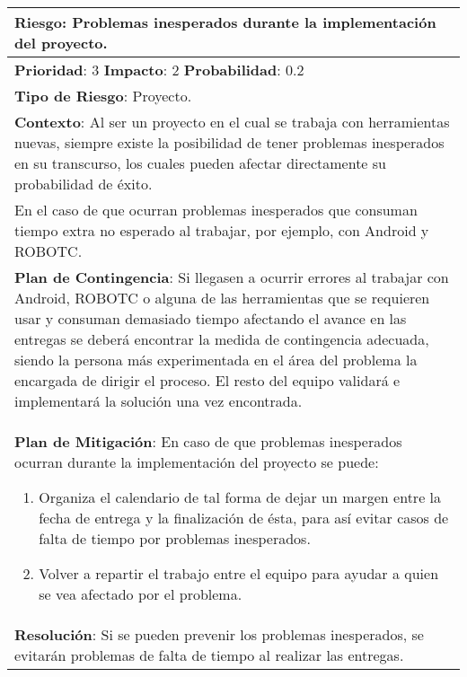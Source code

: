 \begin{table}[H]
  \centering
  \begin{tabular}{|p{15cm}|}\hline
    {\bf Riesgo}: Problemas inesperados durante la implementación del proyecto.\\\hline
    {\bf Prioridad}: 3  {\bf Impacto}: 2  {\bf Probabilidad}: 0.2\\\hline
    {\bf Tipo de Riesgo}: Proyecto.\\\hline
    {\bf Contexto}: Al ser un proyecto en el cual se trabaja con herramientas nuevas, siempre existe la posibilidad de tener problemas inesperados en su transcurso, los cuales pueden afectar directamente su probabilidad de éxito.\\En el caso de que ocurran problemas inesperados que consuman tiempo extra no esperado al trabajar, por ejemplo, con  Android y ROBOTC.\\\hline
    {\bf Plan de Contingencia}: Si llegasen a ocurrir errores al trabajar con Android, ROBOTC o alguna de las herramientas que se requieren usar y consuman demasiado tiempo afectando el avance en las entregas se  deberá encontrar la medida de contingencia adecuada, siendo la persona más experimentada en el área del problema la encargada de dirigir el proceso. El resto del equipo validará e implementará la solución una vez encontrada.\\\hline
    {\bf Plan de Mitigación}:  En caso de que problemas inesperados ocurran durante la implementación  del proyecto se puede:\begin{enumerate}\item Organiza el calendario de tal forma de dejar un margen entre la fecha de entrega y la finalización de ésta, para así evitar casos de falta de tiempo por problemas inesperados.\item Volver a repartir el trabajo entre el equipo para ayudar a quien se vea afectado por el problema.\end{enumerate}\\\hline
    {\bf Resolución}: Si se pueden prevenir los problemas inesperados, se evitarán problemas de falta de tiempo al realizar las entregas.\\\hline
  \end{tabular}
  \label{table:R7}
\end{table}


